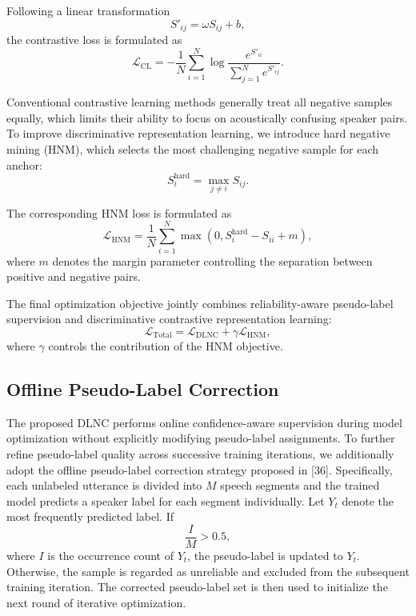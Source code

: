 \documentclass[lettersize,journal]{IEEEtran}
\begin{document}
Following a linear transformation
\begin{equation}
S'_{ij}
=
\omega S_{ij}+b,
\end{equation}
the contrastive loss is formulated as
\begin{equation}
\mathcal{L}_{\mathrm{CL}}
=
-\frac{1}{N}
\sum_{i=1}^{N}
\log
\frac{
e^{S'_{ii}}
}{
\sum_{j=1}^{N}e^{S'_{ij}}
}.
\end{equation}

Conventional contrastive learning methods generally treat all negative samples equally, which limits their ability to focus on acoustically confusing speaker pairs. To improve discriminative representation learning, we introduce hard negative mining (HNM), which selects the most challenging negative sample for each anchor:
\begin{equation}
S_i^{\mathrm{hard}}
=
\max_{j\neq i}
S_{ij}.
\end{equation}

The corresponding HNM loss is formulated as
\begin{equation}
\mathcal{L}_{\mathrm{HNM}}
=
\frac{1}{N}
\sum_{i=1}^{N}
\max
\left(
0,
S_i^{\mathrm{hard}}
-
S_{ii}
+
m
\right),
\end{equation}
where $m$ denotes the margin parameter controlling the separation between positive and negative pairs.

The final optimization objective jointly combines reliability-aware pseudo-label supervision and discriminative contrastive representation learning:
\begin{equation}
\mathcal{L}_{\mathrm{Total}}
=
\mathcal{L}_{\mathrm{DLNC}}
+
\gamma
\mathcal{L}_{\mathrm{HNM}},
\end{equation}
where $\gamma$ controls the contribution of the HNM objective.
\subsection{Offline Pseudo-Label Correction}
The proposed DLNC performs online confidence-aware supervision during model optimization without explicitly modifying pseudo-label assignments. To further refine pseudo-label quality across successive training iterations, we additionally adopt the offline pseudo-label correction strategy proposed in [36]. Specifically, each unlabeled utterance is divided into
$M$ speech segments and the trained model predicts
a speaker label for each segment individually.
Let $Y_t$ denote the most frequently predicted label. If
\begin{equation}
\frac{I}{M} > 0.5,
\end{equation} 
where $I$ is the occurrence count of $Y_t$,
the pseudo-label is updated to $Y_t$.
Otherwise, the sample is regarded as unreliable and
excluded from the subsequent training iteration. The corrected pseudo-label set is then used to initialize
the next round of iterative optimization.
\end{document}
